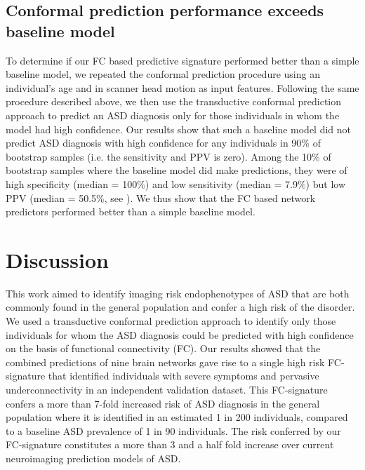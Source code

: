 \documentclass[9pt,lineno]{elife}
\begin{document}
\subsection{Conformal prediction performance exceeds baseline model}
To determine if our FC based predictive signature performed better than a simple baseline model, we repeated the conformal prediction procedure using an individual's age and in scanner head motion as input features. Following the same procedure described above, we then use the transductive conformal prediction approach to predict an ASD diagnosis only for those individuals in whom the model had high confidence. Our results show that such a baseline model did not predict ASD diagnosis with high confidence for any individuals in 90\% of bootstrap samples (i.e. the sensitivity and PPV is zero). Among the 10\% of bootstrap samples where the baseline model did make predictions, they were of high specificity (median = 100\%) and low sensitivity (median = 7.9\%) but low PPV (median = 50.5\%, see ). We thus show that the FC based network predictors performed better than a simple baseline model.

\section{Discussion}
This work aimed to identify imaging risk endophenotypes of ASD that are both commonly found in the general population and confer a high risk of the disorder. We used a transductive conformal prediction approach to identify only those individuals for whom the ASD diagnosis could be predicted with high confidence on the basis of functional connectivity (FC). Our results showed that the combined predictions of nine brain networks gave rise to a single high risk FC-signature that identified individuals with severe symptoms and pervasive underconnectivity in an independent validation dataset. This FC-signature confers a more than 7-fold increased risk of ASD diagnosis in the general population where it is identified in an estimated 1 in 200 individuals, compared to a baseline ASD prevalence of 1 in 90 individuals. The risk conferred by our FC-signature constitutes a more than 3 and a half fold increase over current neuroimaging prediction models of ASD.  
\end{document}
